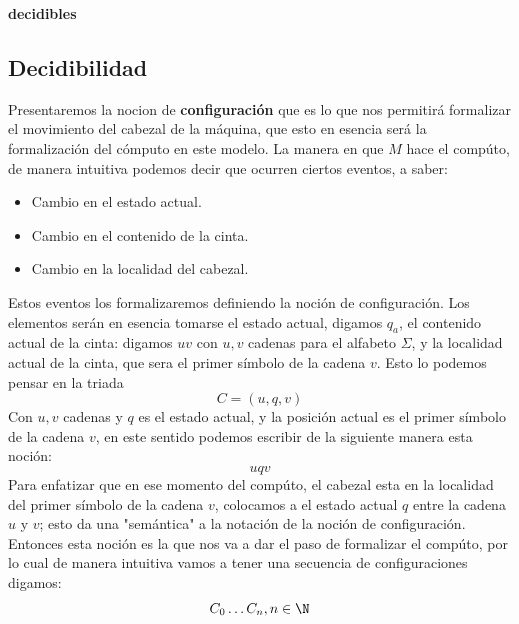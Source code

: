 \documentclass[10pt]{report}
\begin{document}
    \textbf{decidibles}
    \subsection{Decidibilidad}\label{subsec:decidibilidad2}
    Presentaremos la nocion de \textbf{configuración} que es lo que nos permitirá formalizar el movimiento del
    cabezal de la máquina, que esto en esencia será la formalización del cómputo en este modelo.
    \newline
    La manera en que $M$ hace el compúto, de manera intuitiva podemos decir que ocurren ciertos eventos, a saber:
    \begin{itemize}
        \item Cambio en el estado actual.
        \item Cambio en el contenido de la cinta.
        \item Cambio en la localidad del cabezal.
    \end{itemize}
    Estos eventos los formalizaremos definiendo la noción de configuración.
    Los elementos serán en esencia tomarse el estado actual, digamos $q_{a}$, el contenido actual de la cinta:
    digamos $uv$ con $u,v$ cadenas para el alfabeto $\Sigma$, y la localidad actual de la cinta, que sera el primer
    símbolo de la cadena $v$. \newline
    Esto lo podemos pensar en la triada
    \begin{equation}
        C = (u,q,v)
    \end{equation}
    Con $u,v$ cadenas y $q$ es el estado actual, y la posición actual es el primer símbolo de la cadena $v$,
    en este sentido podemos escribir de la siguiente manera esta noción:
    \begin{equation}
        uqv
    \end{equation}
    Para enfatizar que en ese momento del compúto, el cabezal esta en la localidad del primer símbolo de la cadena
    $v$, colocamos a el estado actual $q$ entre la cadena $u$ y $v$; esto da una "semántica" a la notación de la noción
    de configuración.
    \newspace
    Entonces esta noción es la que nos va a dar el paso de formalizar el compúto, por lo cual de manera intuitiva
    vamos a tener una secuencia de configuraciones digamos:
    \begin{equation}
        C_{0}\mathellipsis C_{n}, n\in \N
    \end{equation}
\end{document}
